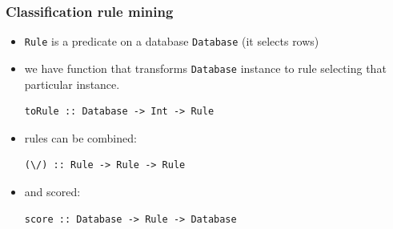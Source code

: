 \documentclass[mathserif, 8pt]{beamer}
\def\fs{\vskip0ex}
\begin{document}
\begin{frame}[fragile]
  \frametitle{Classification rule mining}

  \begin{itemize}
  \item \texttt{Rule}
    is a predicate on a database \texttt{Database} (it selects rows)
    \pause
  \item we have function that transforms \texttt{Database} instance
    to rule selecting that particular instance.
\begin{verbatim}
toRule :: Database -> Int -> Rule
\end{verbatim}
    \pause
  \item rules can be combined:
\begin{verbatim}
(\/) :: Rule -> Rule -> Rule
\end{verbatim}
    \pause
  \item and scored:
\begin{verbatim}
score :: Database -> Rule -> Database
\end{verbatim}
  \end{itemize}

    \pause

\end{frame}
\end{document}
